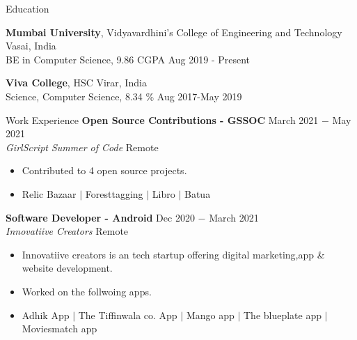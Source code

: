 \documentclass{resume} %
\begin{document}


\begin{rSection}{Education}

{\bf Mumbai University}, Vidyavardhini's College of Engineering and Technology \hfill {Vasai, India} \\
BE in Computer Science, 9.86 CGPA \hfill {Aug 2019 - Present}

{\bf Viva College}, HSC \hfill {Virar, India} \\
Science, Computer Science, 8.34 \% \hfill {Aug 2017-May 2019}

\end{rSection}

% 
%


\begin{rSection}{Work Experience}
\noindent \textbf{Open Source Contributions - GSSOC} \hfill March 2021 $-$ May 2021 \\
\textit{GirlScript Summer of Code} \hfill Remote
\begin{itemize}
    \setlength\itemsep{-0.7em}
     \item Contributed to 4 open source projects.
     \item Relic Bazaar $|$ Foresttagging $|$ Libro $|$ Batua
 \end{itemize}
 
\noindent \textbf{Software Developer - Android} \hfill Dec 2020 $-$ March 2021 \\
\textit{Innovatiive Creators} \hfill Remote
\begin{itemize}
    \setlength\itemsep{-0.7em}
     \item Innovatiive creators is an tech startup offering digital marketing,app & website development.
     \item Worked on the follwoing apps.
     \item Adhik App $|$ The Tiffinwala co. App $|$ Mango app $|$ The blueplate app $|$ Moviesmatch app
 \end{itemize}
 
\end{rSection} 
\end{document}
